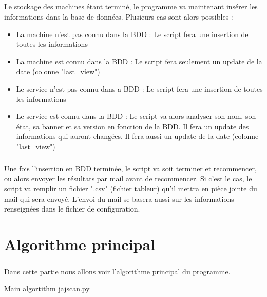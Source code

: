 \documentclass[12pt]{report}
\begin{document}
		\paragraph{}
			Le stockage des machines étant terminé, le programme va maintenant insérer les informations dans la base de données. Plusieurs cas sont alors possibles :
			\begin{itemize}
				\item La machine n'est pas connu dans la BDD : Le script fera une insertion de toutes les informations
				\item La machine est connu dans la BDD : Le script fera seulement un update de la date (colonne "last\_view")
				\item Le service n'est pas connu dans a BDD : Le script fera une insertion de toutes les informations
				\item Le service est connu dans la BDD : Le script va alors analyser son nom, son état, sa banner et sa version en fonction de la BDD. Il fera un update des informations qui auront changées. Il fera aussi un update de la date (colonne "last\_view")
			\end{itemize}
		\paragraph{}
			Une fois l'insertion en BDD terminée, le script va soit terminer et recommencer, ou alors envoyer les résultats par mail avant de recommencer. Si c'est le cas, le script va remplir un fichier ".csv" (fichier tableur) qu'il mettra en pièce jointe du mail qui sera envoyé. L'envoi du mail se basera aussi sur les informations renseignées dans le fichier de configuration.
	\chapter{Algorithme principal}
		\paragraph{}
			Dans cette partie nous allons voir l'algorithme principal du programme.
			\begin{algorithm}
			 \caption{Main algortithm jajscan.py}
			\end{algorithm}
\end{document}
